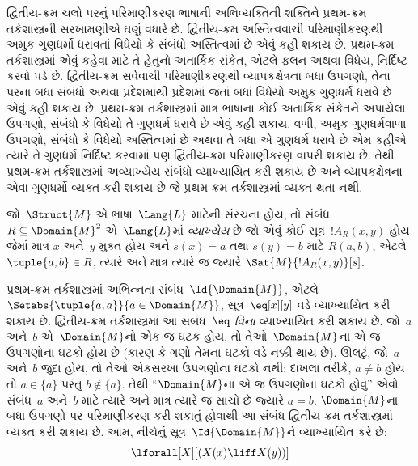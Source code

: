 \begingroup
\makeatletter{}\makeatother

\label{guunit:OLP-0328}


\begin{explain}
દ્વિતીય-ક્રમ ચલો પરનું પરિમાણીકરણ ભાષાની અભિવ્યક્તિની શક્તિને
પ્રથમ-ક્રમ તર્કશાસ્ત્રની સરખામણીએ ઘણું વધારે છે. દ્વિતીય-ક્રમ
અસ્તિત્વવાચી પરિમાણીકરણથી અમુક ગુણધર્મો ધરાવતાં વિધેયો કે સંબંધો
અસ્તિત્વમાં છે એવું કહી શકાય છે. પ્રથમ-ક્રમ તર્કશાસ્ત્રમાં એવું કહેવા
માટે તે હેતુનો અતાર્કિક સંકેત, એટલે ફલન અથવા વિધેય,
નિર્દિષ્ટ કરવો પડે છે. દ્વિતીય-ક્રમ સર્વવાચી પરિમાણીકરણથી વ્યાપકક્ષેત્રના
બધા ઉપગણો, તેના પરના બધા સંબંધો અથવા પ્રદેશમાંથી પ્રદેશમાં
જતાં બધાં વિધેયો અમુક ગુણધર્મ ધરાવે છે એવું કહી શકાય છે. પ્રથમ-ક્રમ
તર્કશાસ્ત્રમાં માત્ર ભાષાના કોઈ અતાર્કિક સંકેતને અપાયેલા ઉપગણો,
સંબંધો કે વિધેયો તે ગુણધર્મ ધરાવે છે એવું કહી શકાય. વળી,
અમુક ગુણધર્મવાળા ઉપગણો, સંબંધો કે વિધેયો અસ્તિત્વમાં છે અથવા તે બધા
એ ગુણધર્મ ધરાવે છે એમ કહીએ ત્યારે તે ગુણધર્મ નિર્દિષ્ટ કરવામાં પણ
દ્વિતીય-ક્રમ પરિમાણીકરણ વાપરી શકાય છે. તેથી પ્રથમ-ક્રમ તર્કશાસ્ત્રમાં
અવ્યાખ્યેય સંબંધો વ્યાખ્યાયિત કરી શકાય છે અને વ્યાપકક્ષેત્રના એવા
ગુણધર્મો વ્યક્ત કરી શકાય છે જે પ્રથમ-ક્રમ તર્કશાસ્ત્રમાં વ્યક્ત થતા
નથી.
\end{explain}

\begin{defn}
જો~$\Struct{M}$ એ ભાષા~$\Lang{L}$ માટેની સંરચના હોય, તો
સંબંધ~$R \subseteq \Domain{M}^2$ એ~$\Lang{L}$માં \emph{વ્યાખ્યેય}
છે જો એવું કોઈ સૂત્ર~$!A_R(x, y)$ હોય જેમાં માત્ર $x$ અને~$y$
મુક્ત હોય અને $s(x) = a$ તથા $s(y) = b$ માટે $R(a, b)$, એટલે
$\tuple{a,b} \in R$, ત્યારે અને માત્ર ત્યારે જ જ્યારે
$\Sat{M}{!A_R(x, y)}[s]$.
\end{defn}

\begin{ex}
પ્રથમ-ક્રમ તર્કશાસ્ત્રમાં અભિન્નતા સંબંધ~$\Id{\Domain{M}}$, એટલે
$\Setabs{\tuple{a,a}}{a \in
  \Domain{M}}$, સૂત્ર~$\eq[x][y]$ વડે વ્યાખ્યાયિત કરી શકાય છે.
દ્વિતીય-ક્રમ તર્કશાસ્ત્રમાં આ સંબંધ~\emph{$\eq$ વિના} વ્યાખ્યાયિત
કરી શકાય છે. જો~$a$ અને~$b$ એ~$\Domain{M}$નો એક જ ઘટક
હોય, તો તેઓ~$\Domain{M}$ના એ જ ઉપગણોના ઘટકો હોય છે (કારણ
કે ગણો તેમના ઘટકો વડે નક્કી થાય છે). ઊલટું, જો~$a$ અને~$b$
જુદા હોય, તો તેઓ એકસરખા ઉપગણોના ઘટકો નથી: દાખલા તરીકે,
$a \neq b$ હોય તો $a \in \{a\}$ પરંતુ $b
\notin \{a\}$. તેથી ``$\Domain{M}$ના એ જ ઉપગણોના ઘટકો
હોવું'' એવો સંબંધ~$a$ અને~$b$ માટે ત્યારે અને માત્ર ત્યારે જ સાચો
છે જ્યારે $a = b$. $\Domain{M}$ના બધા ઉપગણો પર પરિમાણીકરણ કરી
શકાતું હોવાથી આ સંબંધ દ્વિતીય-ક્રમ તર્કશાસ્ત્રમાં વ્યક્ત કરી શકાય છે.
આમ, નીચેનું
સૂત્ર~$\Id{\Domain{M}}$ને વ્યાખ્યાયિત કરે છે:
\[
\lforall[X][(X(x) \liff X(y))]
\]
\end{ex}

